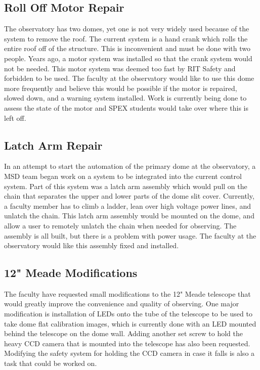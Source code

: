 \documentclass[conference]{IEEEtran} %
\begin{document}
  \subsection{Roll Off Motor Repair}
\label{subsec:rollOffMotorRepair}
The observatory has two domes, yet one is not very widely used because of the system to remove the roof.
The current system is a hand crank which rolls the entire roof off of the structure.
This is inconvenient and must be done with two people.
Years ago, a motor system was installed so that the crank system would not be needed.
This motor system was deemed too fast by RIT Safety and forbidden to be used.
The faculty at the observatory would like to use this dome more frequently and believe this would be possible if the motor is repaired, slowed down, and a warning system installed.
Work is currently being done to assess the state of the motor and SPEX students would take over where this is left off.

\subsection{Latch Arm Repair}
\label{subsec:latchArmRepair}
In an attempt to start the automation of the primary dome at the observatory, a MSD team began work on a system to be integrated into the current control system.
Part of this system was a latch arm assembly which would pull on the chain that separates the upper and lower parts of the dome slit cover.
Currently, a faculty member has to climb a ladder, lean over high voltage power lines, and unlatch the chain.
This latch arm assembly would be mounted on the dome, and allow a user to remotely unlatch the chain when needed for observing.
The assembly is all built, but there is a problem with power usage.
The faculty at the observatory would like this assembly fixed and installed.

\subsection{12" Meade Modifications}
\label{subsec:meadeModifications}
The faculty have requested small modifications to the 12" Meade telescope that would greatly improve the convenience and quality of observing.
One major modification is installation of LEDs onto the tube of the telescope to be used to take dome flat calibration images, which is currently done with an LED mounted behind the telescope on the dome wall.
Adding another set screw to hold the heavy CCD camera that is mounted into the telescope has also been requested.
Modifying the safety system for holding the CCD camera in case it falls is also a task that could be worked on.
\end{document}
